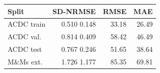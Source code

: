 \label{tab:transition_aggregate_errors}
\begin{tabularx}{\linewidth}{@{}Yrrr@{}}
\toprule
\textbf{Split} & \textbf{SD-NRMSE} & \textbf{RMSE} & \textbf{MAE}\\
\midrule
ACDC train & 0.510 \textpm{} 0.148 & 33.18 & 26.49\\
ACDC val. & 0.814 \textpm{} 0.409 & 58.42 & 46.49\\
ACDC test & 0.767 \textpm{} 0.246 & 51.65 & 38.64\\
M\&Ms ext. & 1.726 \textpm{} 1.177 & 85.35 & 69.81\\
\bottomrule
\end{tabularx}
